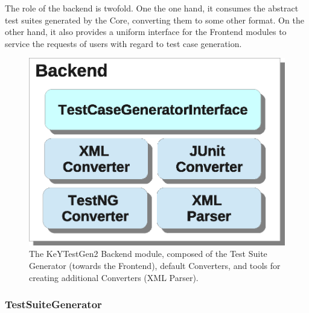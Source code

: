 \documentclass{article}
\newenvironment{tmparmod}[3]{\begin{list}{}{\setlength{\topsep}{0pt}\setlength{\leftmargin}{#1}\setlength{\rightmargin}{#2}\setlength{\parindent}{#3}\setlength{\listparindent}{\parindent}\setlength{\itemindent}{\parindent}\setlength{\parsep}{\parskip}} \item[]}{\end{list}}
\begin{document}
The role of the backend is twofold. One the one hand, it consumes the abstract
test suites generated by the Core, converting them to some other format. On
the other hand, it also provides a uniform interface for the Frontend modules
to service the requests of users with regard to test case generation.



\begin{tmparmod}{2cm}{0pt}{0pt}
  \begin{tmparmod}{0pt}{2cm}{0pt}
    \begin{figure}[h]
      \includegraphics{Backend_Architecture.eps}
      \caption{The KeYTestGen2 Backend module, composed of the Test Suite
      Generator (towards the Frontend), default Converters, and tools for
      creating additional Converters (XML Parser).}
    \end{figure}
  \end{tmparmod}
\end{tmparmod}



\subsubsection{TestSuiteGenerator}
\end{document}
